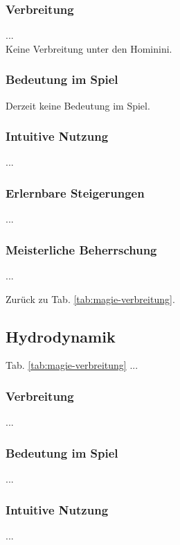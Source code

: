 \subsubsection{Verbreitung}
...\\
Keine Verbreitung unter den Hominini.

\subsubsection{Bedeutung im Spiel}
Derzeit keine Bedeutung im Spiel.

\subsubsection{Intuitive Nutzung}
...

\subsubsection{Erlernbare Steigerungen}
\begin{outline}
	\1 ...
\end{outline}

\subsubsection{Meisterliche Beherrschung} 
\begin{outline}
	\1 ...
\end{outline}
Zurück zu Tab. \ref{tab:magie-verbreitung}.



\subsection{Hydrodynamik}\label{sec:hydrodynamikmagie} Tab. \ref{tab:magie-verbreitung} %
...

\subsubsection{Verbreitung}
...\\

\subsubsection{Bedeutung im Spiel}
...

\subsubsection{Intuitive Nutzung}
...

